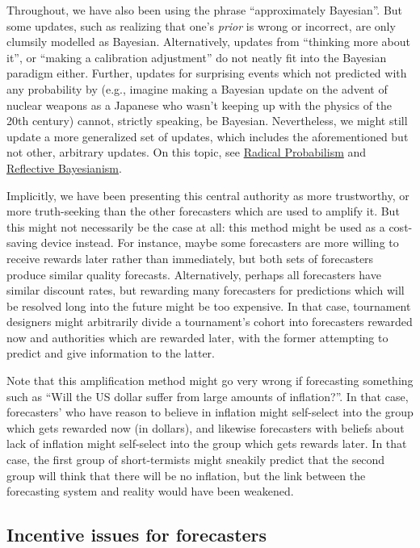 \documentclass[]{article}
\begin{document}
Throughout, we have also been using the phrase ``approximately
Bayesian''. But some updates, such as realizing that one's \emph{prior}
is wrong or incorrect, are only clumsily modelled as Bayesian.
Alternatively, updates from ``thinking more about it'', or ``making a
calibration adjustment'' do not neatly fit into the Bayesian paradigm
either. Further, updates for surprising events which not predicted with
any probability by (e.g., imagine making a Bayesian update on the advent
of nuclear weapons as a Japanese who wasn't keeping up with the physics
of the 20th century) cannot, strictly speaking, be Bayesian.
Nevertheless, we might still update a more generalized set of updates,
which includes the aforementioned but not other, arbitrary updates. On
this topic, see
\href{https://www.lesswrong.com/posts/xJyY5QkQvNJpZLJRo/radical-probabilism-1}{Radical
Probabilism} and
\href{https://www.lesswrong.com/posts/vpvLqinp4FoigqvKy/reflective-bayesianism}{Reflective
Bayesianism}.

Implicitly, we have been presenting this central authority as more
trustworthy, or more truth-seeking than the other forecasters which are
used to amplify it. But this might not necessarily be the case at all:
this method might be used as a cost-saving device instead. For instance,
maybe some forecasters are more willing to receive rewards later rather
than immediately, but both sets of forecasters produce similar quality
forecasts. Alternatively, perhaps all forecasters have similar discount
rates, but rewarding many forecasters for predictions which will be
resolved long into the future might be too expensive. In that case,
tournament designers might arbitrarily divide a tournament's cohort into
forecasters rewarded now and authorities which are rewarded later, with
the former attempting to predict and give information to the latter.

Note that this amplification method might go very wrong if forecasting
something such as ``Will the US dollar suffer from large amounts of
inflation?''. In that case, forecasters' who have reason to believe in
inflation might self-select into the group which gets rewarded now (in
dollars), and likewise forecasters with beliefs about lack of inflation
might self-select into the group which gets rewards later. In that case,
the first group of short-termists might sneakily predict that the second
group will think that there will be no inflation, but the link between
the forecasting system and reality would have been weakened.

\hypertarget{incentive-issues-for-forecasters}{%
\subsection{Incentive issues for
forecasters}\label{incentive-issues-for-forecasters}}
\end{document}
